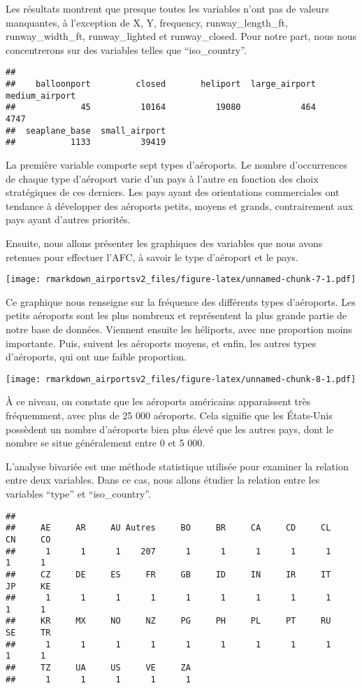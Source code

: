\documentclass[
]{compterendu}
\begin{document}
Les résultats montrent que presque toutes les variables n'ont pas de
valeurs manquantes, à l'exception de X, Y, frequency,
runway\_length\_ft, runway\_width\_ft, runway\_lighted et
runway\_closed. Pour notre part, nous nous concentrerons sur des
variables telles que ``iso\_country''.

\begin{verbatim}
## 
##    balloonport         closed       heliport  large_airport medium_airport 
##             45          10164          19080            464           4747 
##  seaplane_base  small_airport 
##           1133          39419
\end{verbatim}

La première variable comporte sept types d'aéroports. Le nombre
d'occurrences de chaque type d'aéroport varie d'un pays à l'autre en
fonction des choix stratégiques de ces derniers. Les pays ayant des
orientations commerciales ont tendance à développer des aéroports
petits, moyens et grands, contrairement aux pays ayant d'autres
priorités.

Ensuite, nous allons présenter les graphiques des variables que nous
avons retenues pour effectuer l'AFC, à savoir le type d'aéroport et le
pays.

\texttt{[image: rmarkdown\_airportsv2\_files/figure-latex/unnamed-chunk-7-1.pdf]}

Ce graphique nous renseigne sur la fréquence des différents types
d'aéroports. Les petits aéroports sont les plus nombreux et représentent
la plus grande partie de notre base de données. Viennent ensuite les
héliports, avec une proportion moins importante. Puis, suivent les
aéroports moyens, et enfin, les autres types d'aéroports, qui ont une
faible proportion.

\texttt{[image: rmarkdown\_airportsv2\_files/figure-latex/unnamed-chunk-8-1.pdf]}

À ce niveau, on constate que les aéroports américains apparaissent très
fréquemment, avec plus de 25 000 aéroports. Cela signifie que les
États-Unis possèdent un nombre d'aéroports bien plus élevé que les
autres pays, dont le nombre se situe généralement entre 0 et 5 000.

L'analyse bivariée est une méthode statistique utilisée pour examiner la
relation entre deux variables. Dans ce cas, nous allons étudier la
relation entre les variables ``type'' et ``iso\_country''.

\begin{verbatim}
## 
##     AE     AR     AU Autres     BO     BR     CA     CD     CL     CN     CO 
##      1      1      1    207      1      1      1      1      1      1      1 
##     CZ     DE     ES     FR     GB     ID     IN     IR     IT     JP     KE 
##      1      1      1      1      1      1      1      1      1      1      1 
##     KR     MX     NO     NZ     PG     PH     PL     PT     RU     SE     TR 
##      1      1      1      1      1      1      1      1      1      1      1 
##     TZ     UA     US     VE     ZA 
##      1      1      1      1      1
\end{verbatim}
\end{document}
